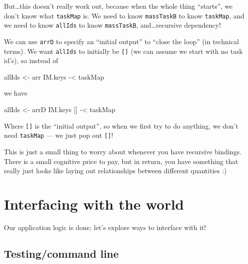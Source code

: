 \documentclass[]{article}
\newenvironment{Shaded}{}{}
\newcommand{\NormalTok}[1]{#1}
\newcommand{\OperatorTok}[1]{\textcolor[rgb]{0.40,0.40,0.40}{#1}}
\newcommand{\OtherTok}[1]{\textcolor[rgb]{0.00,0.44,0.13}{#1}}
\begin{document}
But\ldots this doesn't really work out, because when the whole thing ``starts'',
we don't know what \texttt{taskMap} is. We need to know \texttt{massTaskB} to
know \texttt{taskMap}, and we need to know \texttt{allIds} to know
\texttt{massTaskB}, and\ldots recursive dependency!

We can use \texttt{arrD} to specify an ``initial output'' to ``close the loop''
(in technical terms). We want \texttt{allIds} to initially be \texttt{{[}{]}}
(we can assume we start with no task id's), so instead of

\begin{Shaded}
\begin{Highlighting}[]
\NormalTok{allIds }\OtherTok{\textless{}{-}}\NormalTok{ arr IM.keys }\OperatorTok{{-}\textless{}}\NormalTok{ taskMap}
\end{Highlighting}
\end{Shaded}

we have

\begin{Shaded}
\begin{Highlighting}[]
\NormalTok{allIds }\OtherTok{\textless{}{-}}\NormalTok{ arrD IM.keys [] }\OperatorTok{{-}\textless{}}\NormalTok{ taskMap}
\end{Highlighting}
\end{Shaded}

Where \texttt{{[}{]}} is the ``initial output'', so when we first try to do
anything, we don't need \texttt{taskMap} --- we just pop out \texttt{{[}{]}}!

This is just a small thing to worry about whenever you have recursive bindings.
There is a small cognitive price to pay, but in return, you have something that
really just looks like laying out relationships between different quantities :)

\section{Interfacing with the world}\label{interfacing-with-the-world}

Our application logic is done; let's explore ways to interface with it!

\subsection{Testing/command line}\label{testingcommand-line}
\end{document}
